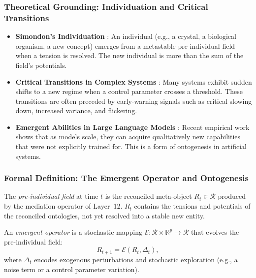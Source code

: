 \subsubsection{Theoretical Grounding: Individuation and Critical Transitions}
\begin{itemize}
    \item \textbf{Simondon's Individuation} \cite{simondon1992}: An individual (e.g., a crystal, a biological organism, a new concept) emerges from a metastable pre-individual field when a tension is resolved. The new individual is more than the sum of the field's potentials.
    \item \textbf{Critical Transitions in Complex Systems} \cite{scheffer2009}: Many systems exhibit sudden shifts to a new regime when a control parameter crosses a threshold. These transitions are often preceded by early-warning signals such as critical slowing down, increased variance, and flickering.
    \item \textbf{Emergent Abilities in Large Language Models} \cite{wei2022}: Recent empirical work shows that as models scale, they can acquire qualitatively new capabilities that were not explicitly trained for. This is a form of ontogenesis in artificial systems.
\end{itemize}

\subsubsection{Formal Definition: The Emergent Operator and Ontogenesis}
\begin{definition}
The \emph{pre-individual field} at time $t$ is the reconciled meta-object $R_t \in \mathcal{R}$ produced by the mediation operator of Layer~12. $R_t$ contains the tensions and potentials of the reconciled ontologies, not yet resolved into a stable new entity.
\end{definition}

\begin{definition}
An \emph{emergent operator} is a stochastic mapping $\mathcal{E}: \mathcal{R} \times \mathbb{R}^p \to \mathcal{R}$ that evolves the pre-individual field:
\[
R_{t+1} = \mathcal{E}(R_t, \Delta_t),
\]
where $\Delta_t$ encodes exogenous perturbations and stochastic exploration (e.g., a noise term or a control parameter variation).
\end{definition}

